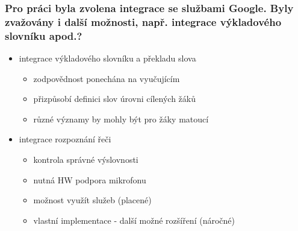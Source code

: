 \begin{frame}[noframenumbering]
\begin{center}
    \frametitle{Pro práci byla zvolena integrace se službami Google. Byly zvažovány i další možnosti, např. integrace výkladového slovníku apod.?}

    \begin{itemize}
        \item integrace výkladového slovníku a překladu slova
        \begin{itemize}
            \item zodpovědnost ponechána na vyučujícím
            \item přizpůsobí definici slov úrovni cílených žáků
            \item různé významy by mohly být pro žáky matoucí
        \end{itemize}
        \item integrace rozpoznání řeči
        \begin{itemize}
            \item kontrola správné výslovnosti
            \item nutná HW podpora mikrofonu
            \item možnost využít služeb (placené)
            \item vlastní implementace - další možné rozšíření (náročné)
        \end{itemize}
    \end{itemize}

\end{center}
\end{frame}


